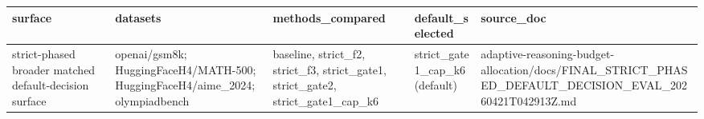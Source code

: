 \begin{tabular}{lllll}
\hline
surface & datasets & methods\_compared & default\_selected & source\_doc \\
\hline
strict-phased broader matched default-decision surface & openai/gsm8k; HuggingFaceH4/MATH-500; HuggingFaceH4/aime\_2024; olympiadbench & baseline, strict\_f2, strict\_f3, strict\_gate1, strict\_gate2, strict\_gate1\_cap\_k6 & strict\_gate1\_cap\_k6 (default) & adaptive-reasoning-budget-allocation/docs/FINAL\_STRICT\_PHASED\_DEFAULT\_DECISION\_EVAL\_20260421T042913Z.md \\
\hline
\end{tabular}
